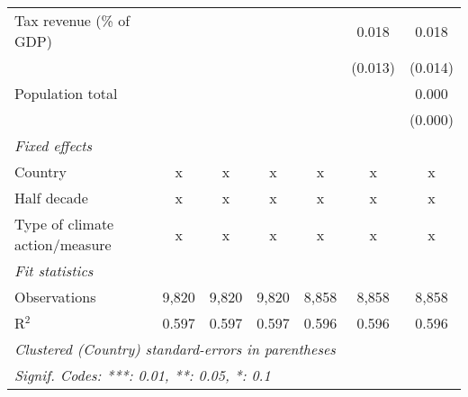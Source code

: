 \begin{tabular}{lcccccc}
   Tax revenue (\% of GDP)                              &               &                &                &               & 0.018         & 0.018\\   
                                                        &               &                &                &               & (0.013)       & (0.014)\\   
   Population total                                     &               &                &                &               &               & 0.000\\   
                                                        &               &                &                &               &               & (0.000)\\   
   \emph{Fixed effects}\\
   Country                                              & x             & x              & x              & x             & x             & x\\  
   Half decade                                          & x             & x              & x              & x             & x             & x\\  
   Type of climate action/measure                       & x             & x              & x              & x             & x             & x\\  
   \midrule \emph{Fit statistics}\\
   Observations                                         & 9,820         & 9,820          & 9,820          & 8,858         & 8,858         & 8,858\\  
   R$^2$                                                & 0.597         & 0.597          & 0.597          & 0.596         & 0.596         & 0.596\\  
   \midrule
   \multicolumn{7}{l}{\emph{Clustered (Country) standard-errors in parentheses}}\\
   \multicolumn{7}{l}{\emph{Signif. Codes: ***: 0.01, **: 0.05, *: 0.1}}\\
\end{tabular}
\par\endgroup


